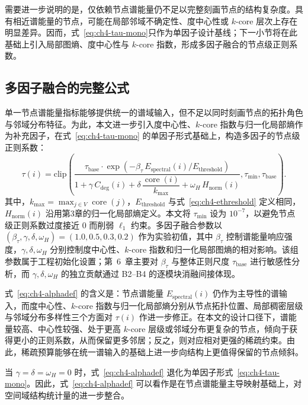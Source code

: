需要进一步说明的是，仅依赖节点谱能量仍不足以完整刻画节点的结构复杂度。具有相近谱能量的节点，可能在局部邻域不确定性、度中心性或 \(k\)-core 层次上存在明显差异。因而，式~\eqref{eq:ch4-tau-mono}只作为单因子设计基线；下一小节将在此基础上引入局部图熵、度中心性与 \(k\)-core 指数，形成多因子融合的节点级正则系数。

\subsection{多因子融合的完整公式}
\label{subsec:ch4-multifactor}
\label{idx:theme:entropy}
单一节点谱能量指标能够提供统一的谱域输入，但不足以同时刻画节点的拓扑角色与邻域分布特征。为此，本文进一步引入度中心性、\(k\)-core 指数与归一化局部熵作为补充因子，在式~\eqref{eq:ch4-tau-mono} 的单因子形式基础上，构造多因子的节点级正则系数：
\begin{equation}
  \tau(i) = \mathrm{clip}\!\left(
    \frac{\tau_{\text{base}} \cdot \exp\!\left(-\beta_{\tau}\,E_{\text{spectral}}(i)/E_{\text{threshold}}\right)}
         {1 + \gamma\,C_{\text{deg}}(i) + \delta\,\dfrac{\operatorname{core}(i)}{k_{\max}} + \omega_H\,H_{\text{norm}}(i)},
    \tau_{\min},\tau_{\text{base}}
  \right).
  \label{eq:ch4-alphadef}
\end{equation}
其中，\(k_{\max}=\max_{j\in V}\operatorname{core}(j)\)，\(E_{\text{threshold}}\) 与式~\eqref{eq:ch4-ethreshold} 定义相同，\(H_{\text{norm}}(i)\) 沿用第3章的归一化局部熵定义。本文将 \(\tau_{\min}\) 设为 \(10^{-7}\)，以避免节点级正则系数过度接近 \(0\) 而削弱 \(\ell_1\) 约束。多因子融合参数以\((\beta_{\tau},\gamma,\delta,\omega_H)=(1.0,0.5,0.3,0.2)\)
作为实验初值，其中 \(\beta_{\tau}\) 控制谱能量响应强度，\(\gamma,\delta,\omega_H\) 分别控制度中心性、\(k\)-core 指数和归一化局部图熵的相对影响。该组参数属于工程初始化设置；第~6~章主要对 \(\beta_{\tau}\) 与整体正则尺度 \(\tau_{\text{base}}\) 进行敏感性分析，而 \(\gamma,\delta,\omega_H\) 的独立贡献通过 B2--B4 的逐模块消融间接体现。

式~\eqref{eq:ch4-alphadef} 的含义是：节点谱能量 \(E_{\text{spectral}}(i)\) 仍作为主导性的谱输入，而度中心性、\(k\)-core 指数与归一化局部熵分别从节点拓扑位置、局部稠密层级与邻域分布多样性三个方面对 \(\tau(i)\) 作进一步修正。在本文的设计口径下，谱能量较高、中心性较强、处于更高 \(k\)-core 层级或邻域分布更复杂的节点，倾向于获得更小的正则系数，从而保留更多邻居；反之，则对应相对更强的稀疏约束。由此，稀疏预算能够在统一谱输入的基础上进一步向结构上更值得保留的节点倾斜。

当 \(\gamma=\delta=\omega_H=0\) 时，式~\eqref{eq:ch4-alphadef} 退化为单因子形式~\eqref{eq:ch4-tau-mono}。因此，式~\eqref{eq:ch4-alphadef} 可以看作是在节点谱能量主导映射基础上，对空间域结构统计量的进一步整合。

